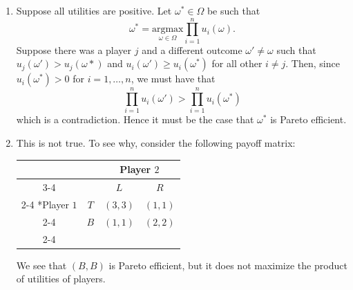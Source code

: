 \documentclass[a4paper]{article}
\begin{document}
\begin{exercise}{1}
\begin{enumerate}[label=(\alph*)]
    \item Suppose all utilities are positive. Let $ \omega^* \in \Omega $ be such that
      \begin{equation*}
        \omega^* = \underset{\omega \in \Omega}{\text{argmax}}\prod_{i = 1}^{n} u_i(\omega)
      .\end{equation*}
      Suppose there was a player $ j $ and a different outcome $ \omega' \neq \omega $ such that $ u_j(\omega') > u_j(\omega*) $ and $ u_i(\omega') \geq u_i(\omega^{*}) $ for all other $ i \neq j $. Then, since $ u_i(\omega^{*}) > 0 $ for $ i = 1, \ldots, n $, we must have that
      \begin{equation*}
      \prod_{i = 1}^{n} u_i(\omega') > \prod_{i = 1}^{n} u_i(\omega^{*})
      \end{equation*}
      which is a contradiction. Hence it must be the case that $ \omega^{*} $ is Pareto efficient.

    \item This is not true. To see why, consider the following payoff matrix:
      \begin{table}[H]
        \setlength{\extrarowheight}{2pt}
        \centering
        \begin{tabular}{*{4}{c|}}
          \multicolumn{2}{c}{} & \multicolumn{2}{c}{Player $2$}\\\cline{3-4}
          \multicolumn{1}{c}{} &  & $L$  & $R$ \\\cline{2-4}
          \multirow{2}*{Player $1$}  & $T$ & $(3, 3)$ & $(1, 1)$ \\\cline{2-4}
                                     & $B$ & $(1, 1)$ & $(2, 2)$ \\\cline{2-4}
        \end{tabular}
      \end{table}
      We see that $ (B,B) $ is Pareto efficient, but it does not maximize the product of utilities of players.
  \end{enumerate}
\end{exercise}
\end{document}
